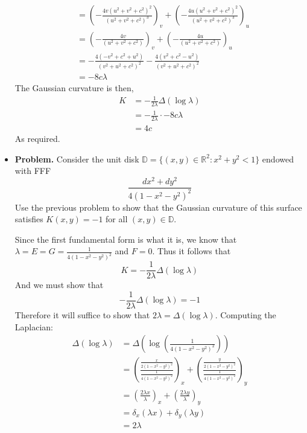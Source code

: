 \documentclass[a4paper,17pt]{extarticle}
\theoremstyle{definition}
\renewcommand{\skip}{\par\null\par}
\newcommand{\R}{\mathbb{R}}
\begin{document}
\begin{itemize}
\begin{align*}
        &=\left(-\frac{4v(u^2+v^2+c^2)^2}{\left(u^2+v^2+c^2\right)^3}\right)_v+\left(-\frac{4u(u^2+v^2+c^2)^2}{\left(u^2+v^2+c^2\right)^3}\right)_u\\
        &=\left(-\frac{4v}{\left(u^2+v^2+c^2\right)}\right)_v+\left(-\frac{4u}{\left(u^2+v^2+c^2\right)}\right)_u\\
        &=-\frac{4\left(-v^2+c^2+u^2\right)}{\left(v^2+u^2+c^2\right)^2}-\frac{4\left(v^2+c^2-u^2\right)}{\left(v^2+u^2+c^2\right)^2}\\
        &=-8c\lambda
    \end{align*}
    The Gaussian curvature is then,
    \begin{align*}
        K&=-\frac{1}{2\lambda}\Delta(\log{\lambda})\\
        &=-\frac{1}{2\lambda}\cdot-8c\lambda\\
        &=4c
    \end{align*}
    As required.
    \item \textbf{Problem.} Consider the unit disk $\mathbb{D}=\{(x,y)\in\R^2:x^2+y^2<1\}$ endowed with FFF $$\frac{dx^2+dy^2}{4(1-x^2-y^2)^2}$$ Use the previous problem to show that the Gaussian curvature of this surface satisfies $K(x,y)=-1$ for all $(x,y)\in\mathbb{D}$.\skip Since the first fundamental form is what it is, we know that $\lambda=E=G=\frac{1}{4(1-x^2-y^2)^2}$ and $F=0$. Thus it follows that $$K=-\frac{1}{2\lambda}\Delta(\log{\lambda})$$ And we must show that $$-\frac{1}{2\lambda}\Delta(\log{\lambda})=-1$$ Therefore it will suffice to show that $2\lambda=\Delta(\log\lambda)$. Computing the Laplacian:\begin{align*}
        \Delta(\log\lambda)&=\Delta\left(\log\left(\frac{1}{4(1-x^2-y^2)^2}\right)\right)\\
        &=\left(\frac{\frac{x}{2\left(1-x^2-y^2\right)^2}}{\frac{1}{4(1-x^2-y^2)^2}}\right)_x+\left(\frac{\frac{y}{2\left(1-x^2-y^2\right)^2}}{\frac{1}{4(1-x^2-y^2)^2}}\right)_y\\
        &=\left(\frac{2\lambda x}{\lambda}\right)_x+\left(\frac{2\lambda y}{\lambda}\right)_y\\
        &=\delta_x(\lambda x)+\delta_y(\lambda y)\\
        &=2\lambda
    \end{align*}
\end{itemize}
\end{document}
